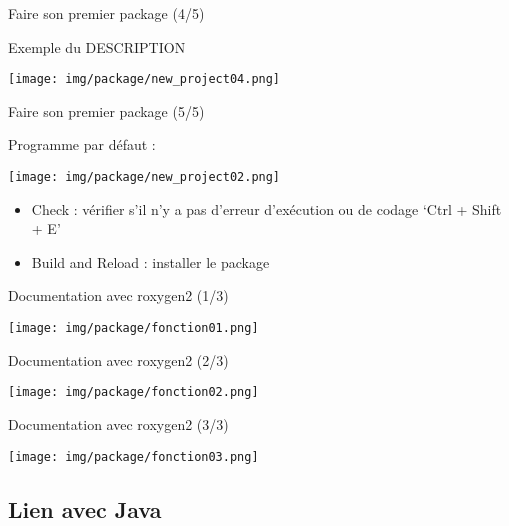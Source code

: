 \documentclass[10pt,xcolor=table,color={dvipsnames,usenames},ignorenonframetext,usepdftitle=false,french]{beamer}
\begin{document}
\begin{frame}{Faire son premier package (4/5)}
\protect\hypertarget{faire-son-premier-package-45}{}

Exemple du DESCRIPTION

\texttt{[image: img/package/new\_project04.png]}

\end{frame}

\begin{frame}{Faire son premier package (5/5)}
\protect\hypertarget{faire-son-premier-package-55}{}

Programme par défaut :

\texttt{[image: img/package/new\_project02.png]}

\begin{itemize}
\item
  Check : vérifier s'il n'y a pas d'erreur d'exécution ou de codage
  `Ctrl + Shift + E'
\item
  Build and Reload : installer le package
\end{itemize}

\end{frame}

\begin{frame}{Documentation avec roxygen2 (1/3)}
\protect\hypertarget{documentation-avec-roxygen2-13}{}

\texttt{[image: img/package/fonction01.png]}

\end{frame}

\begin{frame}{Documentation avec roxygen2 (2/3)}
\protect\hypertarget{documentation-avec-roxygen2-23}{}

\texttt{[image: img/package/fonction02.png]}

\end{frame}

\begin{frame}{Documentation avec roxygen2 (3/3)}
\protect\hypertarget{documentation-avec-roxygen2-33}{}

\texttt{[image: img/package/fonction03.png]}

\end{frame}

\hypertarget{lien-avec-java}{%
\subsection{Lien avec Java}\label{lien-avec-java}}
\end{document}
